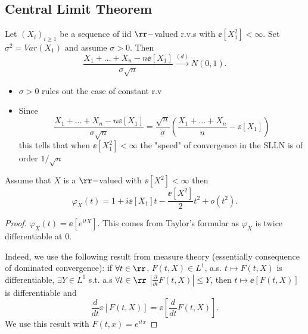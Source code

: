 \documentclass[../main.tex]{subfiles}
\begin{document}
\subsection{Central Limit Theorem}
\begin{theorem}
  Let $(X_i)_{i \geq 1}$ be a sequence of iid $\rr-$valued r.v.s with
  $\ee[X_1^2] < \infty$. Set $\sigma^2 = Var(X_1)$ and assume $\sigma > 0$.
  Then
  \[
    \frac{X_1 + \ldots + X_n - n \ee[X_1]}{\sigma \sqrt{n}}
    \overset{(d)}{\longrightarrow} N(0, 1)
  .\] 
\end{theorem}
\begin{remark}
    \hfill
    \begin{itemize}
      \item $\sigma > 0$ rules out the case of constant r.v
      \item Since 
        \[
    \frac{X_1 + \ldots + X_n - n \ee[X_1]}{\sigma \sqrt{n}}
        = \frac{\sqrt{n}}{\sigma} \left( \frac{X_1 + \ldots + X_n}{n} - \ee[X_1] \right)
        \] 
        this tells that when $\ee[X_1^2] < \infty$ the "speed" of convergence in
        the SLLN is of order $1/\sqrt{n}$
    \end{itemize} 
\end{remark}
\begin{lemma}
  Assume that $X$ is a $\rr-$valued with $\ee[X^2] < \infty$ then
  \[
    \varphi_X(t) = 1 + i \ee[X_1]t - \frac{\ee[X^2]}{2} t^2 + o(t^2)
  .\] 
\end{lemma}
\begin{proof}
  $\varphi_X(t) = \ee[ e^{itX}] $. This comes from Taylor's formular as
  $\varphi_X$ is twice differentiable at $0$.

  Indeed, we use the following result from measure theory (essentially
  consequence of dominated convergence):
  if $\forall t \in \rr$, $F(t, X) \in L^1$, a.s. $t \mapsto F(t, X)$ is
  differentiable, $\exists Y \in L^1$ s.t. a.s $\forall t \in \rr$  $\left|
  \frac{\partial}{\partial t} F(t, X) \right| \leq Y$, then
  $t \mapsto \ee[F(t, X)]$ is differentiable and
  \[
    \frac{d}{dt} \ee[F(t, X)] = \ee[\frac{d}{dt} F(t, X)]
  .\] 
We use this result with $F(t, x) = e^{itx}$
\end{proof}
\end{document}

